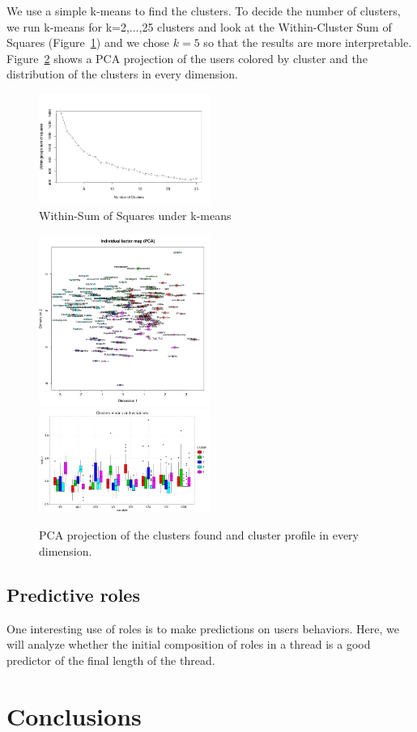 \documentclass[smallextended]{svjour3}          %
\begin{document}
We use a simple k-means to find the clusters. To decide the number of clusters, we run k-means for k=2,...,25 clusters and look at the Within-Cluster Sum of Squares (Figure~\ref{fig:elbow}) and we chose $k=5$ so that the results are more interpretable.  Figure~\ref{fig:PCA} shows a PCA projection of the users colored by cluster and the distribution of the clusters in every dimension.
\begin{figure}
	\centering
	\includegraphics[width=0.5\textwidth]{elbow}
	\caption{Within-Sum of Squares under k-means}
	\label{fig:elbow}
\end{figure}

\begin{figure}
	\centering
	\includegraphics[width=0.5\textwidth]{PCA}
	\includegraphics[width=0.5\textwidth]{whiskers}
	\caption{PCA projection of the clusters found and cluster profile in every dimension.}
	\label{fig:PCA}
\end{figure}

\subsection{Predictive roles}
One interesting use of roles is to make predictions on users behaviors. Here, we will analyze whether the initial composition of roles in a thread is a good predictor of the final length of the thread.

\section{Conclusions}
 
% 
% 

\end{document}

